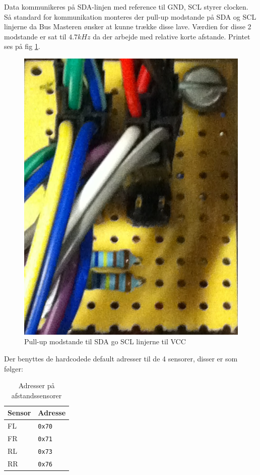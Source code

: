 Data kommunikeres på SDA-linjen med reference til GND, SCL styrer clocken. Så standard for \IIC kommunikation monteres der pull-up modstande på SDA og SCL linjerne da Bus Masteren ønsker at kunne trække disse lave.
Værdien for disse 2 modstande er sat til $4.7kHz$ da der arbejde med relative korte afstande. Printet ses på fig \ref{fig:i2c_print}. 

\begin{figure}[ht]
	\centering
	\includegraphics[scale=0.2]{../fig/billeder/I2C_print.jpg}
	\caption{Pull-up modstande til SDA go SCL linjerne til VCC}
	\label{fig:i2c_print}
\end{figure}

\newpage
Der benyttes de hardcodede default adresser til de 4 sensorer, disser er som følger: 

\begin{table}[ht]\centering
	\begin{tabular}{| l | l |} \hline
		\textbf{Sensor} 	& \textbf{Adresse}  \\\hline
		FL 					& \texttt{0x70} 	\\\hline
		FR 					& \texttt{0x71} 	\\\hline
		RL 					& \texttt{0x73} 	\\\hline
		RR 					& \texttt{0x76} 	\\\hline
	\end{tabular}
	\caption{Adresser på afstandssensorer}
	\label{table:adr_ds}
\end{table}


